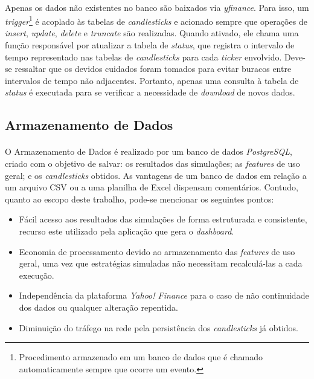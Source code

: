 \paragraph{} Apenas os dados não existentes no banco são baixados via \textit{yfinance}. Para isso, um \textit{trigger}\footnote{Procedimento armazenado em um banco de dados que é chamado automaticamente sempre que ocorre um evento.} é acoplado às tabelas de \textit{candlesticks} e acionado sempre que operações de \textit{insert}, \textit{update}, \textit{delete} e \textit{truncate} são realizadas. Quando ativado, ele chama uma função responsável por atualizar a tabela de \textit{status}, que registra o intervalo de tempo representado nas tabelas de \textit{candlesticks} para cada \textit{ticker} envolvido. Deve-se ressaltar que os devidos cuidados foram tomados para evitar buracos entre intervalos de tempo não adjacentes. Portanto, apenas uma consulta à tabela de \textit{status} é executada para se verificar a necessidade de \textit{download} de novos dados.



\FloatBarrier
\subsection{Armazenamento de Dados}

\paragraph{} O Armazenamento de Dados é realizado por um banco de dados \textit{PostgreSQL}, criado com o objetivo de salvar: os resultados das simulações; as \textit{features} de uso geral; e os \textit{candlesticks} obtidos. As vantagens de um banco de dados em relação a um arquivo CSV ou a uma planilha de Excel dispensam comentários. Contudo, quanto ao escopo deste trabalho, pode-se mencionar os seguintes pontos:

\begin{itemize}
    \item Fácil acesso aos resultados das simulações de forma estruturada e consistente, recurso este utilizado pela aplicação que gera o \textit{dashboard}.
    \item Economia de processamento devido ao armazenamento das \textit{features} de uso geral, uma vez que estratégias simuladas não necessitam recalculá-las a cada execução.
    \item Independência da plataforma \textit{Yahoo! Finance} para o caso de não continuidade dos dados ou qualquer alteração repentida.
    \item Diminuição do tráfego na rede pela persistência dos \textit{candlesticks} já obtidos.
\end{itemize}


